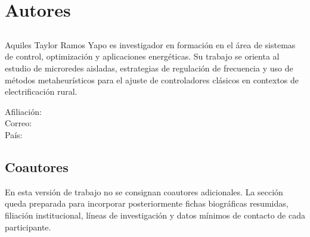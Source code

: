 \chapter*{Autores}

\section*{\AutorPrincipal}
Aquiles Taylor Ramos Yapo es investigador en formación en el área de sistemas de control,
optimización y aplicaciones energéticas. Su trabajo se orienta al estudio de microredes
aisladas, estrategias de regulación de frecuencia y uso de métodos metaheurísticos para el
ajuste de controladores clásicos en contextos de electrificación rural.

Afiliación: \AfiliacionPrincipal\\
Correo: \CorreoContacto\\
País: \PaisAutor

\vspace{1em}

\section*{Coautores}
En esta versión de trabajo no se consignan coautores adicionales. La sección queda preparada
para incorporar posteriormente fichas biográficas resumidas, filiación institucional, líneas de
investigación y datos mínimos de contacto de cada participante.
